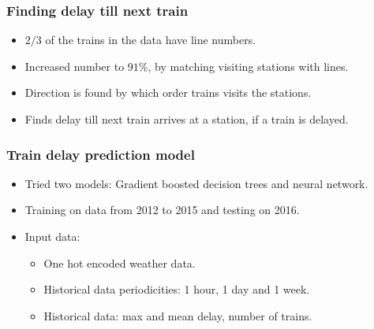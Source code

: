 \documentclass{beamer}
\begin{document}

\begin{frame}\frametitle{Finding delay till next train}
\begin{itemize}
\item $2/3$ of the trains in the data have line numbers.
\item Increased number to $91\%$, by matching visiting stations with lines.
\item Direction is found by which order trains visits the stations.
\item Finds delay till next train arrives at a station, if a train is delayed.
\end{itemize}
\end{frame}


\begin{frame}\frametitle{Train delay prediction model}
\begin{itemize}
\item Tried two models: Gradient boosted decision trees and neural network.
\item Training on data from 2012 to 2015 and testing on 2016.
\item Input data:
	\begin{itemize}
    \item One hot encoded weather data.
    \item Historical data periodicities: 1 hour, 1 day and 1 week.
    \item Historical data: max and mean delay, number of trains. 
    \end{itemize}
\end{itemize}
\end{frame}
\end{document}
